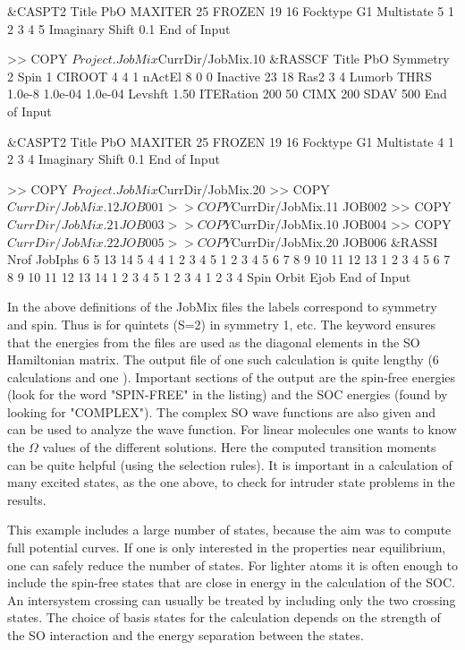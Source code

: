 \begin{inputlisting}
&CASPT2
  Title
  PbO
  MAXITER
    25
  FROZEN
    19 16
  Focktype
  G1
  Multistate
    5 1 2 3 4 5
  Imaginary Shift
    0.1
End of Input

>> COPY $Project.JobMix $CurrDir/JobMix.10
&RASSCF
  Title
  PbO
  Symmetry
    2
  Spin 
    1
  CIROOT
    4 4 1
  nActEl
    8 0 0
  Inactive
    23 18
  Ras2    
    3 4
  Lumorb
  THRS
    1.0e-8 1.0e-04 1.0e-04
  Levshft
    1.50
  ITERation
    200 50
  CIMX
    200
  SDAV
    500
End of Input

&CASPT2
  Title
  PbO
  MAXITER
    25
  FROZEN
    19 16
  Focktype
  G1
  Multistate
    4 1 2 3 4 
  Imaginary Shift
    0.1
End of Input

>> COPY $Project.JobMix $CurrDir/JobMix.20
>> COPY $CurrDir/JobMix.12 JOB001
>> COPY $CurrDir/JobMix.11 JOB002
>> COPY $CurrDir/JobMix.21 JOB003
>> COPY $CurrDir/JobMix.10 JOB004
>> COPY $CurrDir/JobMix.22 JOB005
>> COPY $CurrDir/JobMix.20 JOB006
&RASSI
  Nrof JobIphs
    6 5 13 14 5 4 4
    1 2 3 4 5
    1 2 3 4 5 6 7 8 9 10 11 12 13
    1 2 3 4 5 6 7 8 9 10 11 12 13 14
    1 2 3 4 5
    1 2 3 4
    1 2 3 4
  Spin Orbit
  Ejob
End of Input
\end{inputlisting}

In the above definitions of the JobMix files the labels correspond to 
symmetry and spin. Thus  is for quintets (S=2) in symmetry 1,
etc. The keyword  ensures that the  energies
from the  files are used as the diagonal elements in the SO
Hamiltonian matrix. The output file of one such calculation is quite lengthy (6
 calculations and one ). Important
sections of the   output are the spin-free energies (look for the
word "SPIN-FREE" in the listing) and the SOC energies (found by looking for
"COMPLEX"). The complex SO wave functions are also given and can be used to
analyze the wave function. For linear molecules one wants to know the $\Omega$
values of the different solutions. Here the computed transition moments can be
quite helpful (using the selection rules). It is important in a calculation of
many excited states, as the one above, to check for intruder state problems in
the  results. 

This example includes a large number of states, because the aim was to compute 
full potential curves. If one is only interested in the properties near
equilibrium, one can safely reduce the number of states. For lighter atoms it is
often enough to include the spin-free states that are close in energy in the
calculation of the SOC. An intersystem crossing can usually be treated by
including only the two crossing states. The choice of  basis states for the
 calculation depends on the strength of the SO interaction and
the energy separation between the states.

